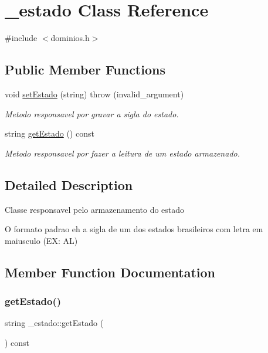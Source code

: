 \hypertarget{class__estado}{}\section{\+\_\+estado Class Reference}
\label{class__estado}


{\ttfamily \#include $<$dominios.\+h$>$}

\subsection*{Public Member Functions}
\begin{DoxyCompactItemize}
\item 
void \mbox{\hyperlink{class__estado_a1fb6884e0493436dd737773f9d47390b}{set\+Estado}} (string)  throw (invalid\+\_\+argument)
\begin{DoxyCompactList}\small\item\em Metodo responsavel por gravar a sigla do estado. \end{DoxyCompactList}\item 
string \mbox{\hyperlink{class__estado_af64dce6db74e9c20beaefe38b1e98406}{get\+Estado}} () const
\begin{DoxyCompactList}\small\item\em Metodo responsavel por fazer a leitura de um estado armazenado. \end{DoxyCompactList}\end{DoxyCompactItemize}


\subsection{Detailed Description}
Classe responsavel pelo armazenamento do estado

O formato padrao eh a sigla de um dos estados brasileiros com letra em maiusculo (EX\+: AL) 

\subsection{Member Function Documentation}
\mbox{\label{class__estado_af64dce6db74e9c20beaefe38b1e98406}} 
\subsubsection{\texorpdfstring{getEstado()}{getEstado()}}
{\footnotesize\ttfamily string \+\_\+estado\+::get\+Estado (\begin{DoxyParamCaption}{ }\end{DoxyParamCaption}) const\hspace{0.3cm}{\ttfamily [inline]}}



